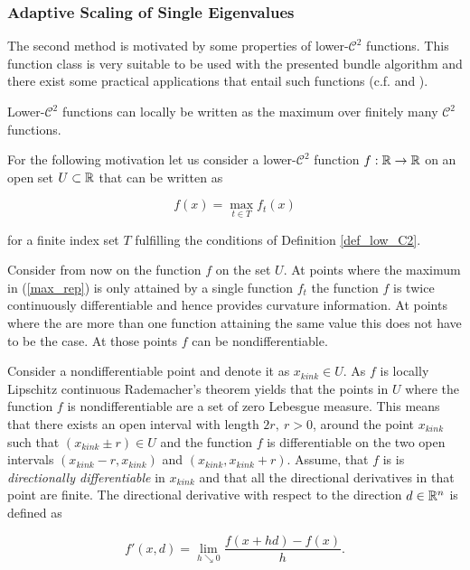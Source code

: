 \subsubsection{Adaptive Scaling of Single Eigenvalues}

The second method is motivated by some properties of lower-\(\mathcal{C}^2\) functions. This function class is very suitable to be used with the presented bundle algorithm and there exist some practical applications that entail such functions (c.f. \cite{Hare2010} and \cite{Hare2016}).

Lower-\(\mathcal{C}^2\) functions can locally be written as the maximum over finitely many \(\mathcal{C}^2\) functions.

For the following motivation let us consider a lower-\(\mathcal{C}^2\) function \(f:\mathbb{R} \to \mathbb{R}\) on an open set \(U \subset \mathbb{R}\) that can be written as

\begin{equation}
	f(x) = \max_{t \in T} f_t(x)
\label{max_rep}
\end{equation}

for a finite index set \(T\) fulfilling the conditions of Definition \ref{def_low_C2}.

Consider from now on the function \(f\) on the set \(U\).
At points where the maximum in (\ref{max_rep}) is only attained by a single function \(f_t\) the function \(f\) is twice continuously differentiable and hence provides curvature information. At points where the are more than one function attaining the same value this does not have to be the case. At those points \(f\) can be nondifferentiable.

Consider a nondifferentiable point and denote it as \(x_{{kink}} \in U\).
As \(f\) is locally Lipschitz continuous Rademacher's theorem yields that the points in \(U\) where the function \(f\) is nondifferentiable are a set of zero Lebesgue measure. This means that there exists an open interval with length \(2r, ~r >0 \), around  the point \(x_{{kink}}\) such that \((x_{{kink}} \pm r) \in U\) and the function \(f\) is differentiable on the two open intervals \((x_{{kink}}-r,x_{{kink}})\)  and \((x_{{kink}},x_{{kink}}+r)\). Assume, that \(f\) is is \emph{directionally differentiable} in \(x_{{kink}}\) and that all the directional derivatives in that point are finite.
The directional derivative with respect to the direction \(d \in \mathbb{R}^n\) is defined as \cite[p. 213]{Rockafellar1970}

\[ f'(x,d) = \lim_{h \searrow 0} \frac{f(x+h d)-f(x)}{h}. \]

